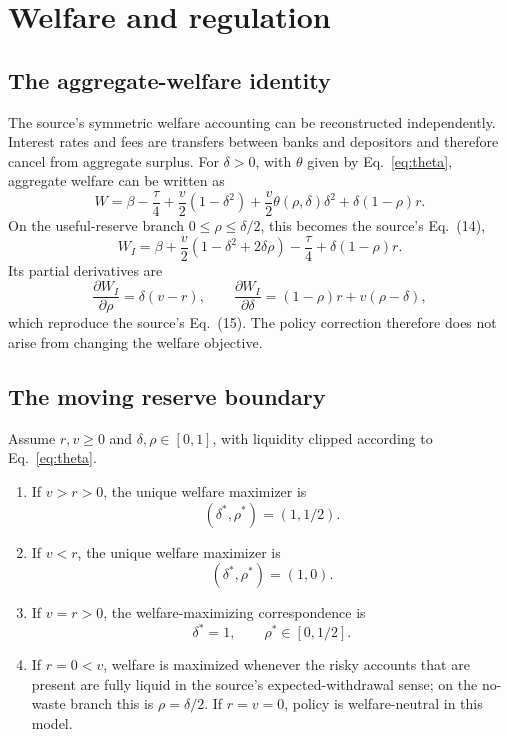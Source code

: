 \section{Welfare and regulation}
\subsection{The aggregate-welfare identity}
The source's symmetric welfare accounting can be reconstructed independently. Interest rates and fees are transfers between banks and depositors and therefore cancel from aggregate surplus. For $\delta>0$, with $\theta$ given by Eq.~\eqref{eq:theta}, aggregate welfare can be written as
\begin{equation}\label{eq:Wgeneral}
W=\beta-\frac{\tau}{4}+\frac v2(1-\delta^2)
+\frac v2\theta(\rho,\delta)\delta^2+\delta(1-\rho)r.
\end{equation}
On the useful-reserve branch $0\le\rho\le\delta/2$, this becomes the source's Eq.~(14),
\begin{equation}\label{eq:Wuseful}
W_I=\beta+\frac v2(1-\delta^2+2\delta\rho)-\frac{\tau}{4}
+\delta(1-\rho)r.
\end{equation}
Its partial derivatives are
\begin{equation}\label{eq:Wpartials}
\frac{\partial W_I}{\partial\rho}=\delta(v-r),\qquad
\frac{\partial W_I}{\partial\delta}=(1-\rho)r+v(\rho-\delta),
\end{equation}
which reproduce the source's Eq.~(15). The policy correction therefore does not arise from changing the welfare objective.

\subsection{The moving reserve boundary}
\begin{proposition}\label{prop:planner}
Assume $r,v\ge0$ and $\delta,\rho\in[0,1]$, with liquidity clipped according to Eq.~\eqref{eq:theta}.
\begin{enumerate}[label=(\roman*)]
\item If $v>r>0$, the unique welfare maximizer is
\[
(\delta^*,\rho^*)=(1,1/2).
\]
\item If $v<r$, the unique welfare maximizer is
\[
(\delta^*,\rho^*)=(1,0).
\]
\item If $v=r>0$, the welfare-maximizing correspondence is
\[
\delta^*=1,\qquad \rho^*\in[0,1/2].
\]
\item If $r=0<v$, welfare is maximized whenever the risky accounts that are present are fully liquid in the source's expected-withdrawal sense; on the no-waste branch this is $\rho=\delta/2$. If $r=v=0$, policy is welfare-neutral in this model.
\end{enumerate}
\end{proposition}

